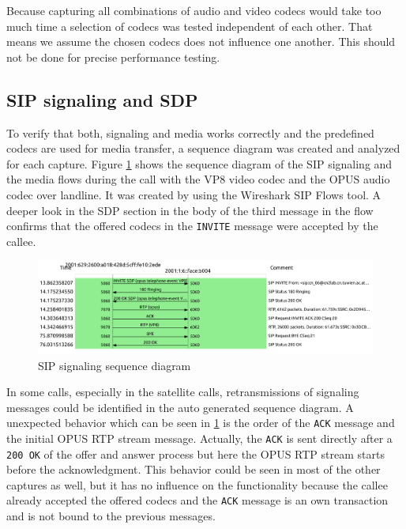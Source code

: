 \documentclass[parskip=full]{scrartcl}
\begin{document}
Because capturing all combinations of audio and video codecs would take too much time a selection of codecs was tested independent of each other.
That means we assume the chosen codecs does not influence one another.
This should not be done for precise performance testing.

\subsection{SIP signaling and SDP} \label{subsec:signaling}

To verify that both, signaling and media works correctly and the predefined codecs are used for media transfer, a sequence diagram was created and analyzed for each capture.
Figure \ref{fig:sigFlow} shows the sequence diagram of the SIP signaling and the media flows during the call with the VP8 video codec and the OPUS audio codec over landline. 
It was created by using the Wireshark SIP Flows tool. 
A deeper look in the SDP section in the body of the third message in the flow confirms that the offered codecs in the \verb|INVITE| message were accepted by the callee.

\begin{figure}[!ht]
	\centering %
	\includegraphics[width=\textwidth]{images/VP8_OPUS_landline_flow.pdf} %
	\caption{SIP signaling sequence diagram} 
	\label{fig:sigFlow} %
\end{figure} 
In some calls, especially in the satellite calls, retransmissions of signaling messages could be identified in the auto generated sequence diagram. 
A unexpected behavior which can be seen in \cref{fig:sigFlow} is the order of the \verb|ACK| message and the initial OPUS RTP stream message. 
Actually, the \verb|ACK| is sent directly after a \verb|200 OK| of the offer and answer process but here the OPUS RTP stream starts before the acknowledgment.
This behavior could be seen in most of the other captures as well, but it has no influence on the functionality because the callee already accepted the offered codecs and the \verb|ACK| message is an own transaction and is not bound to the previous messages.
\end{document}
